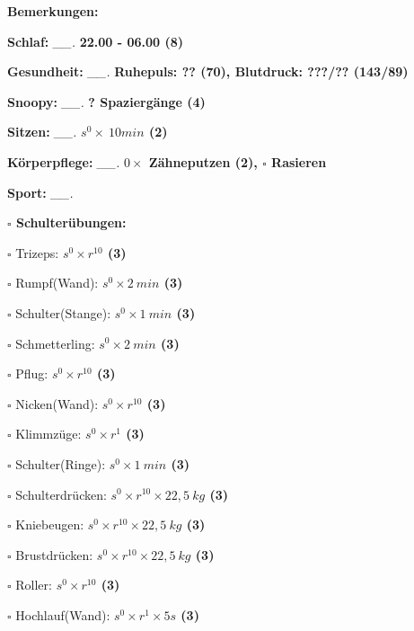 \documentclass[10pt,a4paper]{article}
\newcommand\prop[1] {{\color {alizarin} {\bf #1}}}             %
\newcommand\mand[1] {{\color {burntorange} {\bf #1}}}          %
\newcommand\topspace{\vskip -15pt \hskip 20pt}
\newcommand\n[1] { {\sl #1.} \hskip 5pt }
\begin{document}
\begin{mdframed}[style=daystyle]
  \begin{labeling}{{\mand {Bemerkungen:}}}
    \setlength\itemsep{-3pt}
  \item[{\mand {Schlaf:}}]        \n{\_\_} {\prop {22.00 - 06.00 (8)}}
  \item[{\mand {Gesundheit:}}]    \n{\_\_} {\prop {Ruhepuls: ?? (70), Blutdruck: ???/?? (143/89)}}
  \item[{\mand {Snoopy:}}]        \n{\_\_} {\prop {? Spaziergänge (4)}}    
  \item[{\mand {Sitzen:}}]        \n{\_\_} {\prop {$s^0 \times\ 10 min$ (2)}}
  \item[{\mand {Körperpflege:}}]  \n{\_\_} {\prop {$0 \times$ Zähneputzen (2), $\square$ Rasieren}}
  \item[{\mand {Sport:}}]         \n{\_\_}
    \topspace
    \begin{minipage}{0.75\textwidth}  
      \begin{labeling}{\prop {$\square$ {Schulterübungen:}}} 
        \setlength\itemsep{-3pt}
      \item[$\square$ Trizeps:]          {\prop {$s^0 \times r^{10}$ (3)}}
      \item[$\square$ Rumpf(Wand):]      {\prop {$s^0 \times 2\ min$ (3)}}
      \item[$\square$ Schulter(Stange):] {\prop {$s^0 \times 1\ min$ (3)}}
      \item[$\square$ Schmetterling:]    {\prop {$s^0 \times 2\ min$ (3)}}
      \item[$\square$ Pflug:]            {\prop {$s^0 \times r^{10}$ (3)}}
      \item[$\square$ Nicken(Wand):]     {\prop {$s^0 \times r^{10}$ (3)}}
      \item[$\square$ Klimmzüge:]        {\prop {$s^0 \times r^1$ (3)}}
      \item[$\square$ Schulter(Ringe):]  {\prop {$s^0 \times 1\ min$ (3)}}
      \item[$\square$ Schulterdrücken:]  {\prop {$s^0 \times r^{10} \times 22,5\ kg$ (3)}}
      \item[$\square$ Kniebeugen:]       {\prop {$s^0 \times r^{10} \times 22,5\ kg$ (3)}}
      \item[$\square$ Brustdrücken:]     {\prop {$s^0 \times r^{10} \times 22,5\ kg$ (3)}}
      \item[$\square$ Roller:]           {\prop {$s^0 \times r^{10}$ (3)}}
      \item[$\square$ Hochlauf(Wand):]   {\prop {$s^0 \times r^{1} \times 5s$ (3)}}

\end{labeling}
\end{minipage}
\end{labeling}
\end{mdframed}
\end{document}
